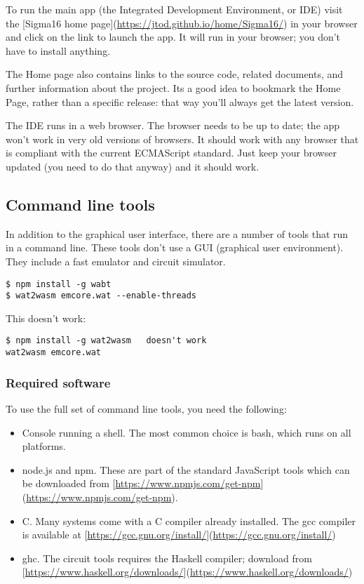 \documentclass[11pt]{article}
\begin{document}
To run the main app (the Integrated Development Environment, or IDE)
visit the [Sigma16 home page](\url{https://jtod.github.io/home/Sigma16/}) in
your browser and click on the link to launch the app.  It will run in
your browser; you don't have to install anything.

The Home page also contains links to the source code, related
documents, and further information about the project.  Its a good idea
to bookmark the Home Page, rather than a specific release: that way
you'll always get the latest version.

The IDE runs in a web browser.  The browser needs to be up to date;
the app won't work in very old versions of browsers.  It should work
with any browser that is compliant with the current ECMAScript
standard.  Just keep your browser updated (you need to do that anyway)
and it should work.

\subsection*{Command line tools}
\label{sec:orgfacaa93}

In addition to the graphical user interface, there are a number of
tools that run in a command line.  These tools don't use a GUI
(graphical user environment).  They include a fast emulator and
circuit simulator.

\begin{verbatim}
$ npm install -g wabt
$ wat2wasm emcore.wat --enable-threads
\end{verbatim}

This doesn't work:
\begin{verbatim}
$ npm install -g wat2wasm   doesn't work
wat2wasm emcore.wat
\end{verbatim}

\subsubsection*{Required software}
\label{sec:org36895f8}

To use the full set of command line tools, you need the following:

\begin{itemize}
\item Console running a shell.  The most common choice is bash, which runs
on all platforms.

\item node.js and npm.  These are part of the standard JavaScript tools
which can be downloaded from
[\url{https://www.npmjs.com/get-npm}](\url{https://www.npmjs.com/get-npm}).

\item C. Many systems come with a C compiler already installed.  The gcc
compiler is available at
[\url{https://gcc.gnu.org/install/}](\url{https://gcc.gnu.org/install/})

\item ghc.  The circuit tools requires the Haskell compiler; download from
[\url{https://www.haskell.org/downloads/}](\url{https://www.haskell.org/downloads/})
\end{itemize}
\end{document}
